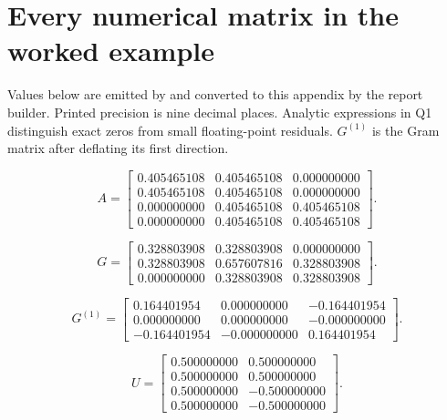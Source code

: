 \documentclass[11pt]{article}
\begin{document}
\section{Every numerical matrix in the worked example}
Values below are emitted by  and converted
to this appendix by the report builder. Printed precision is nine
decimal places. Analytic expressions in Q1 distinguish exact zeros
from small floating-point residuals. $G^{(1)}$ is the Gram matrix
after deflating its first direction.
\noindent\begin{minipage}[t]{.48\textwidth}\footnotesize\setlength{\arraycolsep}{3pt}\[ A=\begin{bmatrix}0.405465108 & 0.405465108 & 0.000000000\\0.405465108 & 0.405465108 & 0.000000000\\0.000000000 & 0.405465108 & 0.405465108\\0.000000000 & 0.405465108 & 0.405465108\end{bmatrix}. \]
\end{minipage}\hfill\begin{minipage}[t]{.48\textwidth}\footnotesize\setlength{\arraycolsep}{3pt}\[ G=\begin{bmatrix}0.328803908 & 0.328803908 & 0.000000000\\0.328803908 & 0.657607816 & 0.328803908\\0.000000000 & 0.328803908 & 0.328803908\end{bmatrix}. \]
\end{minipage}\par
\noindent\begin{minipage}[t]{.48\textwidth}\footnotesize\setlength{\arraycolsep}{3pt}\[ G^{(1)}=\begin{bmatrix}0.164401954 & 0.000000000 & -0.164401954\\0.000000000 & 0.000000000 & -0.000000000\\-0.164401954 & -0.000000000 & 0.164401954\end{bmatrix}. \]
\end{minipage}\hfill\begin{minipage}[t]{.48\textwidth}\footnotesize\setlength{\arraycolsep}{3pt}\[ U=\begin{bmatrix}0.500000000 & 0.500000000\\0.500000000 & 0.500000000\\0.500000000 & -0.500000000\\0.500000000 & -0.500000000\end{bmatrix}. \]
\end{minipage}\par
\end{document}

